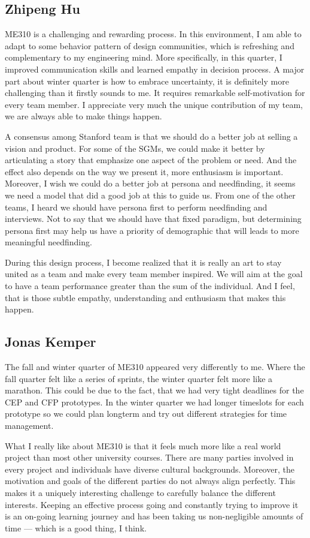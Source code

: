 \subsection*{Zhipeng Hu}
ME310 is a challenging and rewarding process. In this environment, I am able to adapt to some behavior pattern of design communities, which is refreshing and complementary to my engineering mind. More specifically, in this quarter, I improved communication skills and learned empathy in decision process. A major part about winter quarter is how to embrace uncertainty, it is definitely more challenging than it firstly sounds to me. It requires remarkable self-motivation for every team member. I appreciate very much the unique contribution of my team, we are always able to make things happen. 

A consensus among Stanford team is that we should do a better job at selling a vision and product. For some of the SGMs, we could make it better by articulating a story that emphasize one aspect of the problem or need. And the effect also depends on the way we present it, more enthusiasm is important. Moreover, I wish we could do a better job at persona and needfinding, it seems we need a model that did a good job at this to guide us. From one of the other teams, I heard we should have persona first to perform needfinding and interviews. Not to say that we should have that fixed paradigm, but determining persona first may help us have a priority of demographic that will leads to more meaningful needfinding. 

During this design process, I become realized that it is really an art to stay united as a team and make every team member inspired. We will aim at the goal to have a team performance greater than the sum of the individual. And I feel, that is those subtle empathy, understanding and enthusiasm that makes this happen.

\subsection*{Jonas Kemper}
The fall and winter quarter of ME310 appeared very differently to me. Where the fall quarter felt like a series of sprints, the winter quarter felt more like a marathon. This could be due to the fact, that we had very tight deadlines for the CEP and CFP prototypes. In the winter quarter we had longer timeslots for each prototype so we could plan longterm and try out different strategies for time management.

What I really like about ME310 is that it feels much more like a real world project than most other university courses. There are many parties involved in every project and individuals have diverse cultural backgrounds. Moreover, the motivation and goals of the different parties do not always align perfectly. This makes it a uniquely interesting challenge to carefully balance the different interests. Keeping an effective process going and constantly trying to improve it is an on-going learning journey and has been taking us non-negligible amounts of time --- which is a good thing, I think.

